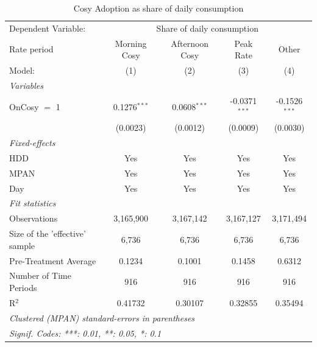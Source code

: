 
\begin{table}[htbp]
   \caption{Cosy Adoption as share of daily consumption}
   \centering
   \begin{tabular}{lcccc}
      \tabularnewline \midrule \midrule
      Dependent Variable: & \multicolumn{4}{c}{Share of daily consumption}\\
      Rate period                    & Morning Cosy   & Afternoon Cosy & Peak Rate       & Other \\   
      Model:                         & (1)            & (2)            & (3)             & (4)\\  
      \midrule
      \emph{Variables}\\
      OnCosy $=$ 1                   & 0.1276$^{***}$ & 0.0608$^{***}$ & -0.0371$^{***}$ & -0.1526$^{***}$\\   
                                     & (0.0023)       & (0.0012)       & (0.0009)        & (0.0030)\\   
      \midrule
      \emph{Fixed-effects}\\
      HDD                            & Yes            & Yes            & Yes             & Yes\\  
      MPAN                           & Yes            & Yes            & Yes             & Yes\\  
      Day                            & Yes            & Yes            & Yes             & Yes\\  
      \midrule
      \emph{Fit statistics}\\
      Observations                   & 3,165,900      & 3,167,142      & 3,167,127       & 3,171,494\\  
      Size of the 'effective' sample & 6,736          & 6,736          & 6,736           & 6,736\\  
      Pre-Treatment Average          & 0.1234         & 0.1001         & 0.1458          & 0.6312\\  
      Number of Time Periods         & 916            & 916            & 916             & 916\\  
      R$^2$                          & 0.41732        & 0.30107        & 0.32855         & 0.35494\\  
      \midrule \midrule
      \multicolumn{5}{l}{\emph{Clustered (MPAN) standard-errors in parentheses}}\\
      \multicolumn{5}{l}{\emph{Signif. Codes: ***: 0.01, **: 0.05, *: 0.1}}\\
   \end{tabular}
\end{table}


